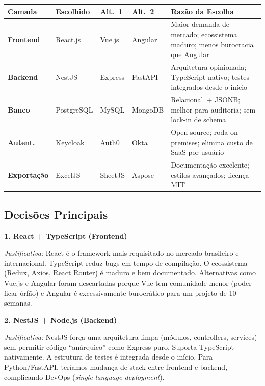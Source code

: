 \documentclass[12pt,a4paper]{article}
\begin{document}
\begin{tabularx}{\linewidth}{>{\bfseries}l l l l >{\raggedright\arraybackslash}X}
  \toprule
  \textbf{Camada} & \textbf{Escolhido} & \textbf{Alt.~1} & \textbf{Alt.~2} & \textbf{Razão da Escolha} \\
  \midrule
  Frontend   & React.js   & Vue.js  & Angular & Maior demanda de mercado; ecossistema maduro; menos burocracia que Angular \\[4pt]
  Backend    & NestJS     & Express & FastAPI & Arquitetura opinionada; TypeScript nativo; testes integrados desde o início \\[4pt]
  Banco      & PostgreSQL & MySQL   & MongoDB & Relacional~+ JSONB; melhor para auditoria; sem lock-in de schema \\[4pt]
  Autent.    & Keycloak   & Auth0   & Okta    & Open-source; roda on-premises; elimina custo de SaaS por usuário \\[4pt]
  Exportação & ExcelJS    & SheetJS & Aspose  & Documentação excelente; estilos avançados; licença MIT \\
  \bottomrule
\end{tabularx}

\subsection{Decisões Principais}

\begin{caixaazul}
\textbf{1. React + TypeScript (Frontend)}

\textit{Justificativa:} React é o framework mais requisitado no mercado brasileiro e internacional.
TypeScript reduz bugs em tempo de compilação. O ecossistema (Redux, Axios, React Router) é
maduro e bem documentado. Alternativas como Vue.js e Angular foram descartadas porque Vue
tem comunidade menor (poder ficar órfão) e Angular é excessivamente burocrático para um
projeto de 10 semanas.
\end{caixaazul}

\begin{caixaazul}
\textbf{2. NestJS + Node.js (Backend)}

\textit{Justificativa:} NestJS força uma arquitetura limpa (módulos, controllers, services)
sem permitir código ``anárquico'' como Express puro. Suporta TypeScript nativamente. A
estrutura de testes é integrada desde o início. Para Python/FastAPI, teríamos mudança de
stack entre frontend e backend, complicando DevOps (\textit{single language deployment}).
\end{caixaazul}
\end{document}
